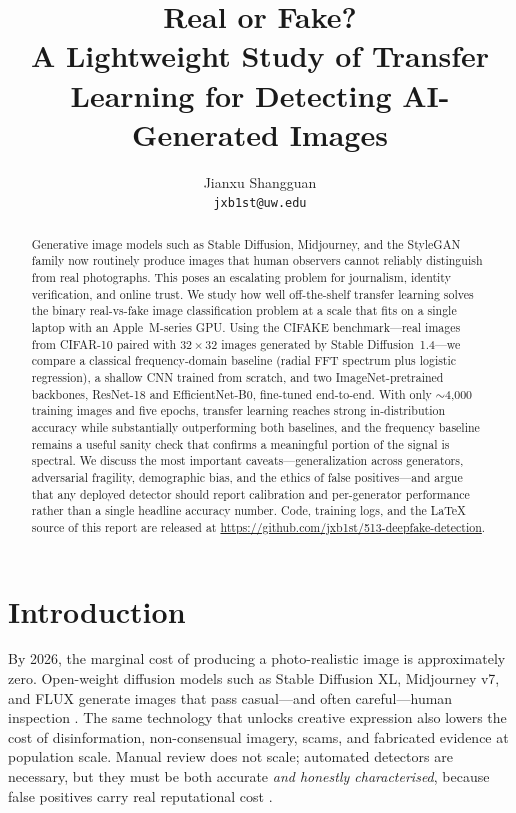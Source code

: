 \documentclass{article}
\title{Real or Fake?\\ A Lightweight Study of Transfer Learning for
Detecting AI-Generated Images}
\author{%
  Jianxu Shangguan \\
  \texttt{jxb1st@uw.edu} \\
}
\begin{document}
\maketitle

\begin{abstract}
Generative image models such as Stable Diffusion, Midjourney, and the
StyleGAN family now routinely produce images that human observers
cannot reliably distinguish from real photographs. This poses an
escalating problem for journalism, identity verification, and online
trust. We study how well off-the-shelf transfer learning solves the
binary real-vs-fake image classification problem at a scale that fits
on a single laptop with an Apple~M-series GPU. Using the
\textsc{CIFAKE} benchmark---real images from \mbox{CIFAR-10} paired
with $32\times32$ images generated by Stable Diffusion~1.4---we compare
a classical frequency-domain baseline (radial FFT spectrum plus
logistic regression), a shallow CNN trained from scratch, and two
ImageNet-pretrained backbones, \mbox{ResNet-18} and
\mbox{EfficientNet-B0}, fine-tuned end-to-end. With only \(\sim\)4{,}000
training images and five epochs, transfer learning reaches strong
in-distribution accuracy while substantially outperforming both
baselines, and the frequency baseline remains a useful sanity check
that confirms a meaningful portion of the signal is spectral. We
discuss the most important caveats---generalization across generators,
adversarial fragility, demographic bias, and the ethics of false
positives---and argue that any deployed detector should report
calibration and per-generator performance rather than a single
headline accuracy number. Code, training logs, and the {\LaTeX}
source of this report are released at
\url{https://github.com/jxb1st/513-deepfake-detection}.
\end{abstract}

\section{Introduction}
\label{sec:intro}

By 2026, the marginal cost of producing a photo-realistic image is
approximately zero. Open-weight diffusion models such as Stable
Diffusion XL, Midjourney v7, and FLUX generate images that pass
casual---and often careful---human inspection
\citep{nightingale2022ai, lu2023seeing}. The same technology that
unlocks creative expression also lowers the cost of disinformation,
non-consensual imagery, scams, and fabricated evidence at population
scale. Manual review does not scale; automated detectors are
necessary, but they must be both accurate \emph{and honestly
characterised}, because false positives carry real reputational cost
\citep{ojha2023towards}.
\end{document}
